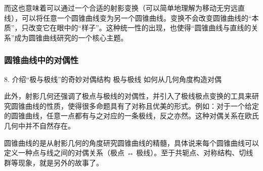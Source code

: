 而这也意味着可以通过一个合适的射影变换（可以简单地理解为移动无穷远直线），可以将任意一个圆锥曲线变为另一个圆锥曲线。变换不会改变圆锥曲线的“本质”，只改变它在眼中的“样子”。这种统一性的出现，也使得“圆锥曲线与直线的关系”成为圆锥曲线研究的一个核心主题。

\subsubsection{圆锥曲线中的对偶性}


	8.	介绍“极与极线”的奇妙对偶结构
极与极线	如何从几何角度构造对偶

此外，射影几何还强调了极点与极线的对偶性，并引入了极线极点变换的工具来研究圆锥曲线的性质，使得很多命题具有了对称且优美的形式。例如：对于一个给定的圆锥曲线，任意一点都有与之对应的一条极线，反之亦然。这种对偶关系在欧氏几何中并不自然存在。

圆锥曲线的是从射影几何的角度研究圆锥曲线的精髓，具体说来每个圆锥曲线可以定义一种点与线之间的对偶关系（极点 ↔ 极线）。至于共轭点、对称结构、切线群等现象，就是另外的故事了。



